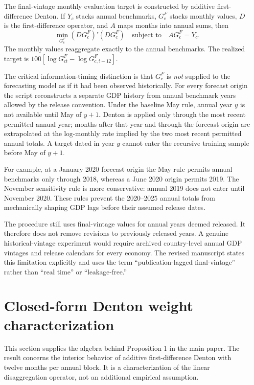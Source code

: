 \documentclass[12pt]{article}
\begin{document}
The final-vintage monthly evaluation target is constructed by additive first-difference Denton. If $Y_c$ stacks annual benchmarks, $G_c^F$ stacks monthly values, $D$ is the first-difference operator, and $A$ maps months into annual sums, then
\[
\min_{G_c^F}(DG_c^F)'(DG_c^F)\quad\text{subject to}\quad AG_c^F=Y_c.
\]
The monthly values reaggregate exactly to the annual benchmarks. The realized target is $100[\log G^F_{ct}-\log G^F_{c,t-12}]$.

The critical information-timing distinction is that $G_c^F$ is \emph{not} supplied to the forecasting model as if it had been observed historically. For every forecast origin the script reconstructs a separate GDP history from annual benchmark years allowed by the release convention. Under the baseline May rule, annual year $y$ is not available until May of $y+1$. Denton is applied only through the most recent permitted annual year; months after that year and through the forecast origin are extrapolated at the log-monthly rate implied by the two most recent permitted annual totals. A target dated in year $y$ cannot enter the recursive training sample before May of $y+1$.

For example, at a January 2020 forecast origin the May rule permits annual benchmarks only through 2018, whereas a June 2020 origin permits 2019. The November sensitivity rule is more conservative: annual 2019 does not enter until November 2020. These rules prevent the 2020--2025 annual totals from mechanically shaping GDP lags before their assumed release dates.

The procedure still uses final-vintage values for annual years deemed released. It therefore does not remove revisions to previously released years. A genuine historical-vintage experiment would require archived country-level annual GDP vintages and release calendars for every economy. The revised manuscript states this limitation explicitly and uses the term ``publication-lagged final-vintage'' rather than ``real time'' or ``leakage-free.''


\section{Closed-form Denton weight characterization}
This section supplies the algebra behind Proposition 1 in the main paper. The result concerns the interior behavior of additive first-difference Denton with twelve months per annual block. It is a characterization of the linear disaggregation operator, not an additional empirical assumption.
\end{document}
